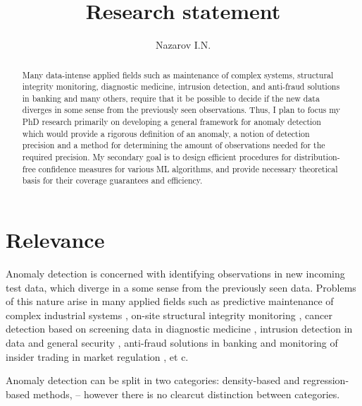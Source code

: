 \documentclass{extarticle}
\title{Research statement}
\author{Nazarov I.N.}
\begin{document}
\maketitle
\begin{abstract}
Many data-intense applied fields such as maintenance of complex systems, structural
integrity monitoring, diagnostic medicine, intrusion detection, and anti-fraud solutions
in banking and many others, require that it be possible to decide if the new data
diverges in some sense from the previously seen observations. Thus, I plan to focus
my PhD research primarily on developing a general framework for anomaly detection
which would provide a rigorous definition of an anomaly, a notion of detection precision
and a method for determining the amount of observations needed for the required precision.
My secondary goal is to design efficient procedures for distribution-free confidence
measures for various ML algorithms, and provide necessary theoretical basis for
their coverage guarantees and efficiency.
\end{abstract}

\section{Relevance} %
\label{sec:relevance}

Anomaly detection is concerned with identifying observations in new incoming test
data, which diverge in a some sense from the previously seen data. Problems of this
nature arise in many applied fields such as predictive maintenance of complex industrial
systems \cite{tarassenko2009}, on-site structural integrity monitoring \cite{surace2010},
cancer detection based on screening data in diagnostic medicine \cite{tarassenko1995,quinn2007,clifton2011},
intrusion detection in data and general security \cite{jyothsna2011}, anti-fraud
solutions in banking and monitoring of insider trading in market regulation \cite{patcha2007},
et c.

Anomaly detection can be split in two categories: density-based and regression-based
methods, -- however there is no clearcut distinction between categories.
\end{document}
